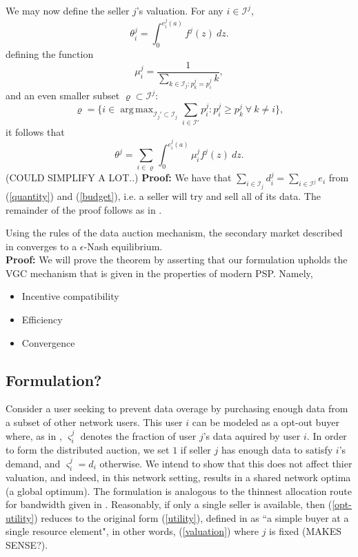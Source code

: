 \documentclass[12pt]{article}
\theoremstyle{definition}
\newcommand{\vs}{\varsigma}
\newcommand{\mcI}{\mathcal{I}}
\DeclareMathOperator*{\argmax}{arg\,max}
\begin{document}
\begin{multicols}{2}
We may now define the seller $j$'s valuation. 
{
For any $i\in\mcI^j$, 
\begin{equation}
    \theta_i^j = \int_0^{e_i^j(a)} f^j(z) \ dz.
\end{equation}
defining the function
$$
\mu_i^j = \frac{1}{\sum_{k\in\mcI_j:p_k^j=p_i^j} k},
$$
and an even smaller subset $\varrho\subset\mcI^j$:
$$
    \varrho = \bigg\lbrace i \in \argmax_{\mcI_j'\subset\mcI_j}
\displaystyle\sum_{i\in\mcI'} p_i^j : p_i^j \ge p_k^j \ \forall \ k\ne
i\bigg\rbrace,
$$
it follows that 
\begin{equation}\label{valuation}
    \theta^j = \displaystyle\sum_{i\in\varrho}
 \int_0^{e_i^j(a)} \mu_i^j f^j(z) \ dz.
\end{equation}
}
(COULD SIMPLIFY A LOT..)
\textbf{Proof:} 
We have that $\sum_{i\in{\mcI_j}} d_i^j = 
\sum_{i\in\mcI^j} e_i$ from (\ref{quantity}) and (\ref{budget}),
i.e. a seller will try and sell all of its data. The remainder of the proof
follows as in \cite{semret}.


{
Using the rules of the data auction mechanism, the secondary market described in \cite{zheng} converges to a $\epsilon$-Nash equilibrium.
}\\
\textbf{Proof:}
We will prove the theorem by asserting that our formulation upholds the VGC
mechanism that is given in the properties of modern PSP. Namely,
\begin{itemize}
    \item Incentive compatibility
    \item Efficiency 
    \item Convergence
\end{itemize}

\subsection{Formulation?}
Consider a user seeking to prevent
data overage by purchasing enough data from a subset of other network users.
This user $i$ can be modeled as a opt-out buyer where, as in \cite{semret}, $\vs_i^j$ denotes the
fraction of user $j$'s data aquired by user $i$. In order to form the
distributed auction, we set $1$ if seller $j$ has enough data to
satisfy $i$'s demand, and $\vs_i^j=d_i$ otherwise. We intend to show that this
does not affect thier valuation, and indeed, in this network setting, results in a shared network optima (a
global optimum). The formulation is analogous to the thinnest allocation route for
bandwidth given in \cite{lazar}. Reasonably, if only a single seller is available, then
(\ref{opt-utility}) reduces to the original form (\ref{utility}), defined in
\cite{semret} as ``a simple buyer at a single resource element", in other
words, (\ref{valuation}) where $j$ is fixed (MAKES SENSE?).


\end{multicols}
\end{document}
